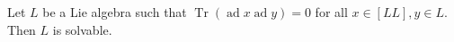 Let $L$ be a Lie algebra such that $\operatorname{Tr}(\operatorname{ad} x \operatorname{ad} y) = 0$ for all $x \in [LL], y \in L$. Then $L$ is solvable.
